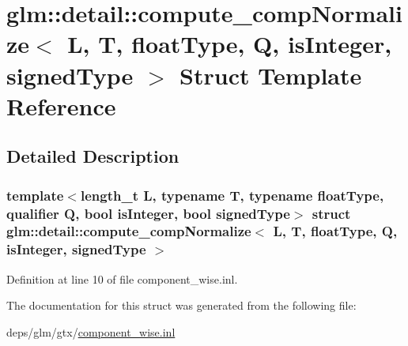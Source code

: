 \hypertarget{structglm_1_1detail_1_1compute__compNormalize}{}\section{glm\+:\+:detail\+:\+:compute\+\_\+comp\+Normalize$<$ L, T, float\+Type, Q, is\+Integer, signed\+Type $>$ Struct Template Reference}
\label{structglm_1_1detail_1_1compute__compNormalize}


\subsection{Detailed Description}
\subsubsection*{template$<$length\+\_\+t L, typename T, typename float\+Type, qualifier Q, bool is\+Integer, bool signed\+Type$>$\newline
struct glm\+::detail\+::compute\+\_\+comp\+Normalize$<$ L, T, float\+Type, Q, is\+Integer, signed\+Type $>$}



Definition at line 10 of file component\+\_\+wise.\+inl.



The documentation for this struct was generated from the following file\+:\begin{DoxyCompactItemize}
\item 
deps/glm/gtx/\hyperlink{component__wise_8inl}{component\+\_\+wise.\+inl}\end{DoxyCompactItemize}

